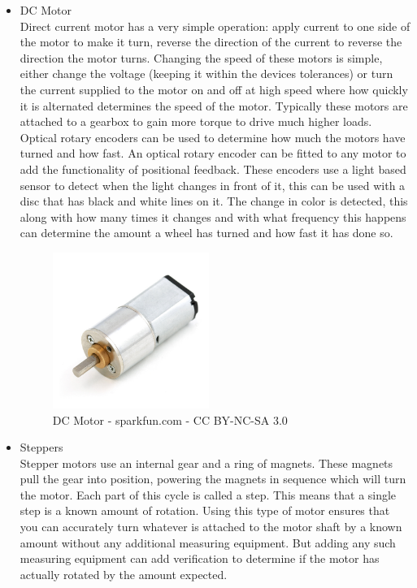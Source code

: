 \begin{itemize}
\item DC Motor
\\Direct current motor has a very simple operation: apply current to one side of the motor to make it turn, reverse the direction of the current to reverse the direction the motor turns.  Changing the speed of these motors is simple, either change the voltage (keeping it within the devices tolerances) or turn the current supplied to the motor on and off at high speed where how quickly it is alternated determines the speed of the motor.  Typically these motors are attached to a gearbox to gain more torque to drive much higher loads.  Optical rotary encoders can be used to determine how much the motors have turned and how fast.  An optical rotary encoder can be fitted to any motor to add the functionality of positional feedback.  These encoders use a light based sensor to detect when the light changes in front of it, this can be used with a disc that has black and white lines on it.  The change in color is detected, this along with how many times it changes and with what frequency this happens can determine the amount a wheel has turned and how fast it has done so.
\begin{figure}[H]
\centering
        \includegraphics[width=2.0in] {Images/dc-motor.jpg}
        \caption{DC Motor - sparkfun.com - CC BY-NC-SA 3.0}
        \label{DC Motor}
\end{figure}
\item Steppers
\\Stepper motors use an internal gear and a ring of magnets.  These magnets pull the gear into position, powering the magnets in sequence which will turn the motor.  Each part of this cycle is called a step.  This means that a single step is a known amount of rotation.  Using this type of motor ensures that you can accurately turn whatever is attached to the motor shaft by a known amount without any additional measuring equipment.  But adding any such measuring equipment can add verification to determine if the motor has actually rotated by the amount expected.

\end{itemize}
